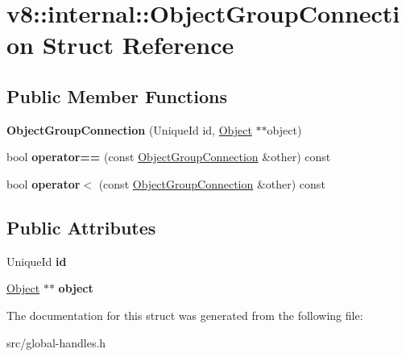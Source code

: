 \hypertarget{structv8_1_1internal_1_1_object_group_connection}{}\section{v8\+:\+:internal\+:\+:Object\+Group\+Connection Struct Reference}
\label{structv8_1_1internal_1_1_object_group_connection}
\subsection*{Public Member Functions}
\begin{DoxyCompactItemize}
\item 
\hypertarget{structv8_1_1internal_1_1_object_group_connection_aae942fc86972d3e4b3789de8c32615da}{}{\bfseries Object\+Group\+Connection} (Unique\+Id id, \hyperlink{classv8_1_1internal_1_1_object}{Object} $\ast$$\ast$object)\label{structv8_1_1internal_1_1_object_group_connection_aae942fc86972d3e4b3789de8c32615da}

\item 
\hypertarget{structv8_1_1internal_1_1_object_group_connection_ab39b4572ee5f01d26517501fb91e5e87}{}bool {\bfseries operator==} (const \hyperlink{structv8_1_1internal_1_1_object_group_connection}{Object\+Group\+Connection} \&other) const \label{structv8_1_1internal_1_1_object_group_connection_ab39b4572ee5f01d26517501fb91e5e87}

\item 
\hypertarget{structv8_1_1internal_1_1_object_group_connection_ad0adfd0b34ab39d150b1b0e9ee078077}{}bool {\bfseries operator$<$} (const \hyperlink{structv8_1_1internal_1_1_object_group_connection}{Object\+Group\+Connection} \&other) const \label{structv8_1_1internal_1_1_object_group_connection_ad0adfd0b34ab39d150b1b0e9ee078077}

\end{DoxyCompactItemize}
\subsection*{Public Attributes}
\begin{DoxyCompactItemize}
\item 
\hypertarget{structv8_1_1internal_1_1_object_group_connection_ac9945a8f8541e7f539ee06ef82c8ebfe}{}Unique\+Id {\bfseries id}\label{structv8_1_1internal_1_1_object_group_connection_ac9945a8f8541e7f539ee06ef82c8ebfe}

\item 
\hypertarget{structv8_1_1internal_1_1_object_group_connection_a28554c5bd2d7fe28cd62323dd87e52f3}{}\hyperlink{classv8_1_1internal_1_1_object}{Object} $\ast$$\ast$ {\bfseries object}\label{structv8_1_1internal_1_1_object_group_connection_a28554c5bd2d7fe28cd62323dd87e52f3}

\end{DoxyCompactItemize}


The documentation for this struct was generated from the following file\+:\begin{DoxyCompactItemize}
\item 
src/global-\/handles.\+h\end{DoxyCompactItemize}
